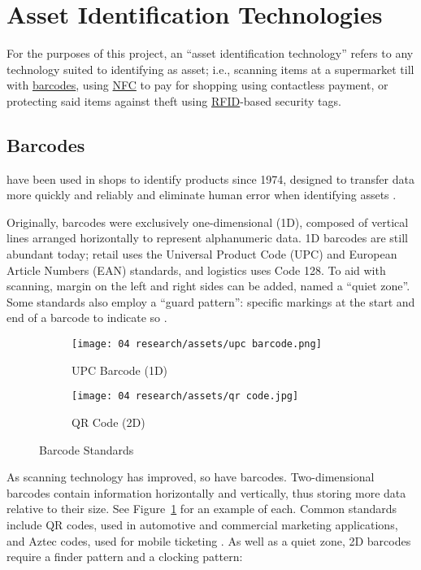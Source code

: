 \section{Asset Identification Technologies}

For the purposes of this project, an \enquote{asset
  identification technology} refers to any technology suited
to identifying as asset; i.e., scanning items at a
supermarket till with \hyperref[ss:barcodes]{barcodes},
using \hyperref[ss:nfc]{NFC} to pay for shopping using
contactless payment, or protecting said items against theft
using \hyperref[ss:rfid]{RFID}-based security tags.

\subsection{Barcodes} \label{ss:barcodes}

 have been used in shops to
identify products
since 1974, designed to transfer data more quickly and
reliably and eliminate human error when identifying assets
\parencite{whatIsABarcode}.

Originally, barcodes were exclusively one-dimensional (1D),
composed of vertical lines arranged horizontally to
represent alphanumeric data.
1D barcodes are still abundant today; retail uses
the Universal Product Code (UPC) and European Article
Numbers (EAN) standards, and logistics uses Code 128.
To aid with scanning, margin on the left and right sides
can be added, named a \enquote{quiet zone}.
Some standards also employ a \enquote{guard pattern}:
specific markings at the start and end of a barcode to
indicate so \parencite{whatIsABarcode}.


\begin{figure}[h]
  \centering
  \begin{subfigure}{\subfigwidth}
    \centering
    \texttt{[image: 04
      research/assets/upc barcode.png]}
    \caption{UPC Barcode (1D)}
    \parencite{img:upcBarcode}
  \end{subfigure}
  \begin{subfigure}{\subfigwidth}
    \centering
    \texttt{[image: 04
      research/assets/qr code.jpg]}
    \caption{QR Code (2D)}
    \parencite{img:qrCode}
  \end{subfigure}

  \caption{Barcode Standards}
  \label{fig:barcodes}
\end{figure}

As scanning technology has improved, so have barcodes.
Two-dimensional barcodes contain information horizontally
and vertically, thus storing more data relative to their
size.
See Figure~\ref{fig:barcodes} for an example of each.
Common standards include QR codes, used in automotive and
commercial marketing applications, and Aztec codes, used
for mobile ticketing \parencite{whatIsABarcode}.
As well as a quiet zone, 2D barcodes require a finder
pattern and a clocking pattern: 

